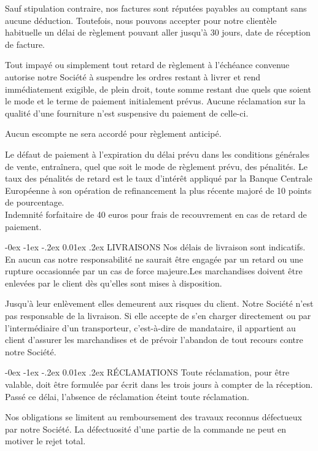 \documentclass[a4paper, oneside, 10pt, french]{article}
\makeatletter
\renewcommand{\section}{\@startsection {section}{1}{\z@}%
             {-0ex \@plus -1ex \@minus -.2ex}%
             {0.01ex \@plus.2ex}%
             {\normalfont\normalsize\sffamily}}
\makeatother
\begin{document}
\begin{multicols}{2}
\begin{small}
Sauf stipulation contraire, nos factures sont réputées payables au comptant sans aucune
déduction. Toutefois, nous pouvons accepter pour notre clientèle habituelle un délai de
règlement pouvant aller jusqu'à 30 jours, date de réception de facture.

Tout impayé ou simplement tout retard de règlement à l'échéance convenue autorise notre
Société à suspendre les ordres restant à livrer et rend immédiatement exigible, de plein droit,
toute somme restant due quels que soient le mode et le terme de paiement initialement prévus.
Aucune réclamation sur la qualité d'une fourniture n'est suspensive du paiement de celle-ci.

Aucun escompte ne sera accordé pour règlement anticipé.

Le défaut de paiement à l'expiration du délai prévu dans les conditions générales de vente,
entraînera, quel que soit le mode de règlement prévu, des pénalités. Le taux des pénalités de
retard est le taux d'intérêt appliqué par la Banque Centrale Européenne à son opération de
refinancement la plus récente majoré de 10 points de pourcentage. \\
Indemnité forfaitaire de 40 euros pour frais de recouvrement en cas de retard de paiement.

\section{LIVRAISONS}
Nos délais de livraison sont indicatifs. En aucun cas notre responsabilité ne saurait être
engagée par un retard ou une rupture occasionnée par un cas de force majeure.Les marchandises doivent être enlevées par le client dès qu'elles sont mises à disposition.

Jusqu'à leur enlèvement elles demeurent aux risques du client. Notre Société n'est pas
responsable de la livraison. Si elle accepte de s'en charger directement ou par l'intermédiaire
d'un transporteur, c'est-à-dire de mandataire, il appartient au client d'assurer les
marchandises et de prévoir l'abandon de tout recours contre notre Société.

\section{RÉCLAMATIONS}
Toute réclamation, pour être valable, doit être formulée par écrit dans les trois jours à compter
de la réception. Passé ce délai, l'absence de réclamation éteint toute réclamation.

Nos obligations se limitent au remboursement des travaux reconnus défectueux par notre
Société. La défectuosité d'une partie de la commande ne peut en motiver le rejet total.


\end{small}
\end{multicols}
\end{document}
